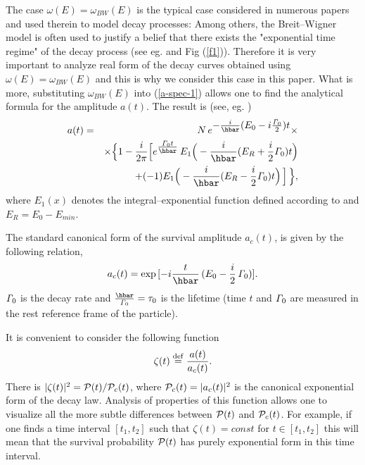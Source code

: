 \documentclass[12pt]{article}
\begin{document}
The case $\omega (E) = \omega_{BW}(E)$ is the typical case considered  in  numerous papers
and used therein  to model decay processes:
Among others, the Breit--Wigner model is often used to justify a belief  that there exists 
the "exponential time regime" of the decay process (see eg. \cite{peshkin,sluis} and Fig (\ref{f1})).
Therefore it is very important to analyze real form of the decay curves obtained using
$\omega (E) = \omega_{BW}(E)$ and this is why we consider this case in this paper. What is more,
substituting  $\omega_{BW}(E)$ into (\ref{a-spec-1}) allows one to find the analytical formula for the
amplitude $a(t)$. The result is  (see, eg. \cite{sluis,ku-2008,ku-2009})
\begin{eqnarray}
a(t) &=& N\,e^{\textstyle{- \frac{i}{\hbar} (E_{0} -
i\frac{{\it\Gamma}_{0}}{2})t}} \times \nonumber\\
&&\times \Big\{1 - \frac{i}{2\pi} \Big[
e^{\textstyle{\frac{{\it\Gamma}_{0}t}{\hbar}}}\,
E_{1}\Big(-\frac{i}{\hbar}(E_{R}
+ \frac{i}{2} {\it\Gamma}_{0})t\Big) \nonumber\\
&&\;\;\;\;\;+ (-1) E_{1}\Big(- \frac{i}{\hbar}(E_{R} -
\frac{i}{2} {\it\Gamma}_{0})t\Big)\,\Big]\, \Big\}, \label{a-E(1)}
\end{eqnarray}
where $E_{1}(x)$ denotes the integral--exponential function defined according to
\cite{abramowitz} and $E_{R} = E_{0} - E_{min}$.


The standard canonical form of the survival amplitude $a_{c}(t)$, is given by the following relation,
\begin{equation}
a_{c}(t) = \exp\,[{-i\frac{t}{\hbar}\,(E_{0} - \frac{i}{2}\,{\it\Gamma}_{0})}].
\end{equation}
${\it\Gamma}_{0}$ is the decay rate and $\frac{\hbar}{{\it\Gamma}_{0}} = \tau_{0}$ is the lifetime  (time $t$ and ${\it\Gamma}_{0}$
are measured in the rest reference frame of the particle).

It is convenient to consider the following function
\begin{equation}
\zeta (t) \stackrel{\rm def}{=} \frac{a(t)}{a_{c}(t)}. \label{zeta}
\end{equation}
There is $|\zeta (t)|^{2} = {\cal P}(t)/{\cal P}_{c}(t)$,
where ${\cal P}_{c}(t) = |a_{c}(t)|^{2}$ is the canonical exponential form of the decay law.
Analysis of properties of this function allows one to visualize all the more subtle differences between ${\cal P}(t)$ and
${\cal P}_{c}(t)$. For example, if one finds a time interval $[t_{1},t_{2}]$  such that  $\zeta (t) =const$ for $t \in [t_{1},t_{2}]$ this will mean that the survival probability
${\cal P}(t)$ has purely exponential form in this time interval.
\end{document}
